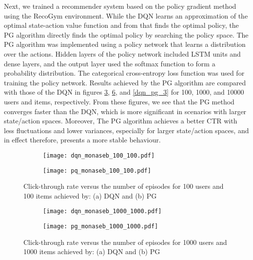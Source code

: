 \documentclass[journal]{IEEEtran}
\begin{document}
Next, we trained a recommender system based on the policy gradient method using the RecoGym environment. While the DQN learns an approximation of the optimal state-action value function and from that finds the optimal policy, the PG algorithm directly finds the optimal policy by searching the policy space. The PG algorithm was implemented using a policy network that learns a distribution over the actions. Hidden layers of the policy network included LSTM units and dense layers, and the output layer used the softmax function to form a probability distribution. The categorical cross-entropy loss function was used for training the policy network. Results achieved by the PG algorithm are compared with those of the DQN in figures \ref{dqn_pg_1}, \ref{dqn_pg_2}, and \ref{dqn_pg_3} for 100, 1000, and 10000 users and items, respectively. From these figures, we see that the PG method converges faster than the DQN, which is more significant in scenarios with larger state/action spaces. Moreover, The PG algorithm achieves a better CTR with less fluctuations and lower variances, especially for larger state/action spaces, and in effect therefore, presents a more stable behaviour.


\begin{figure}[!ht]
\centering
\begin{subfigure}[b]{0.45\textwidth}
\texttt{[image: dqn\_monaseb\_100\_100.pdf]}
\caption{}
\label{}
\end{subfigure}
\quad
\begin{subfigure}[b]{0.45\textwidth}
\texttt{[image: pq\_monaseb\_100\_100.pdf]}
\caption{}
\label{huber_eval}
\end{subfigure}
\caption{Click-through rate versus the number of  episodes for 100 users and 100 items achieved by: (a) DQN and (b) PG}\label{dqn_pg_1}
\end{figure}

%

\begin{figure}[!ht]
\centering
\begin{subfigure}[b]{0.45\textwidth}
\texttt{[image: dqn\_monaseb\_1000\_1000.pdf]}
\caption{}
\label{}
\end{subfigure}
\quad
\begin{subfigure}[b]{0.45\textwidth}
\texttt{[image: pg\_monaseb\_1000\_1000.pdf]}
\caption{}
\label{huber_eval}
\end{subfigure}
\caption{Click-through rate versus the number of  episodes for 1000 users and 1000 items achieved by: (a) DQN and (b) PG}\label{dqn_pg_2}
\end{figure}
\end{document}

